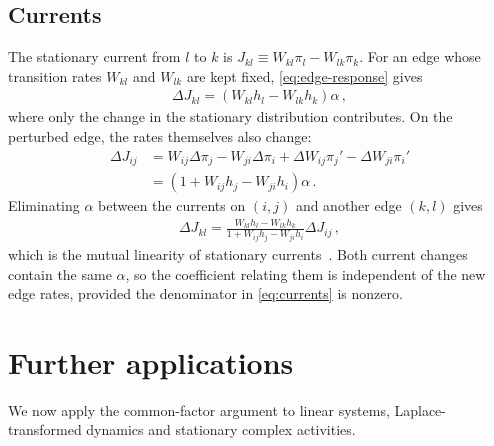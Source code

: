 \documentclass[
  reprint,
  superscriptaddress,
  amsmath,
  amssymb,
  aps,
  pre,
  longbibliography
]{revtex4-2}
\begin{document}
\subsection{Currents}

The stationary current from $l$ to $k$ is
\mbox{$J_{kl}\equiv W_{kl}\pi_l-W_{lk}\pi_k$}.
For an edge whose transition rates $W_{kl}$ and $W_{lk}$ are kept fixed,
\cref{eq:edge-response} gives
\begin{align}
    \Delta J_{kl}=(W_{kl}h_l-W_{lk}h_k)\alpha\,,
    \label{eq:output-current}
\end{align}
where only the change in the stationary distribution contributes.
On the perturbed edge, the rates themselves also change:
\begin{align}
    \Delta J_{ij}
    &=W_{ij}\Delta\pi_j-W_{ji}\Delta\pi_i
      +\Delta W_{ij}\pi_j'-\Delta W_{ji}\pi_i'
    \nonumber\\
    &=(1+W_{ij}h_j-W_{ji}h_i)\alpha\,.
    \label{eq:input-current}
\end{align}
Eliminating $\alpha$ between the currents on $(i,j)$ and another edge
$(k,l)$ gives
\begin{align}
    \Delta J_{kl}
    =\frac{W_{kl}h_l-W_{lk}h_k}
          {1+W_{ij}h_j-W_{ji}h_i}\Delta J_{ij}\,,
    \label{eq:currents}
\end{align}
which is the mutual linearity of stationary
currents~\cite{Harunari2024,Khodabandehlou2025,DalCengio2025,Polettini2026Coplanarity}.
Both current changes contain the same $\alpha$, so the coefficient relating them is independent of the new edge rates, provided the denominator in \cref{eq:currents} is nonzero.


\section{Further applications}
\label{sec:applications}

We now apply the common-factor argument to linear systems, Laplace-transformed dynamics
and stationary complex activities. 
\end{document}
